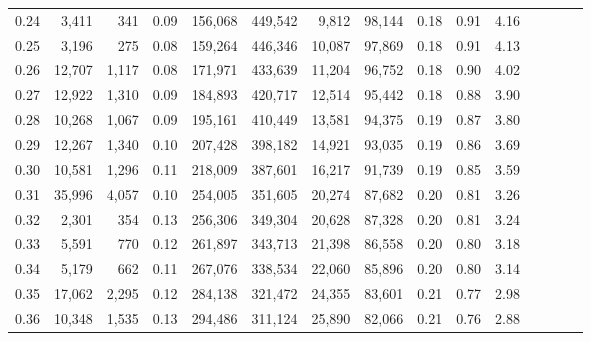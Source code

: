 \begin{tabular}{rrrcrrrrrrrrrrr}
0.24 &   3,411 &    341 &                                       0.09 &  156,068 &  449,542 &    9,812 &   98,144 &  0.18 &  0.91 &                         4.16 \\
0.25 &   3,196 &    275 &                                       0.08 &  159,264 &  446,346 &   10,087 &   97,869 &  0.18 &  0.91 &                         4.13 \\
0.26 &  12,707 &  1,117 &                                       0.08 &  171,971 &  433,639 &   11,204 &   96,752 &  0.18 &  0.90 &                         4.02 \\
0.27 &  12,922 &  1,310 &                                       0.09 &  184,893 &  420,717 &   12,514 &   95,442 &  0.18 &  0.88 &                         3.90 \\
0.28 &  10,268 &  1,067 &                                       0.09 &  195,161 &  410,449 &   13,581 &   94,375 &  0.19 &  0.87 &                         3.80 \\
0.29 &  12,267 &  1,340 &                                       0.10 &  207,428 &  398,182 &   14,921 &   93,035 &  0.19 &  0.86 &                         3.69 \\
0.30 &  10,581 &  1,296 &                                       0.11 &  218,009 &  387,601 &   16,217 &   91,739 &  0.19 &  0.85 &                         3.59 \\
0.31 &  35,996 &  4,057 &                                       0.10 &  254,005 &  351,605 &   20,274 &   87,682 &  0.20 &  0.81 &                         3.26 \\
0.32 &   2,301 &    354 &                                       0.13 &  256,306 &  349,304 &   20,628 &   87,328 &  0.20 &  0.81 &                         3.24 \\
0.33 &   5,591 &    770 &                                       0.12 &  261,897 &  343,713 &   21,398 &   86,558 &  0.20 &  0.80 &                         3.18 \\
0.34 &   5,179 &    662 &                                       0.11 &  267,076 &  338,534 &   22,060 &   85,896 &  0.20 &  0.80 &                         3.14 \\
0.35 &  17,062 &  2,295 &                                       0.12 &  284,138 &  321,472 &   24,355 &   83,601 &  0.21 &  0.77 &                         2.98 \\
0.36 &  10,348 &  1,535 &                                       0.13 &  294,486 &  311,124 &   25,890 &   82,066 &  0.21 &  0.76 &                         2.88 \\

\end{tabular}
